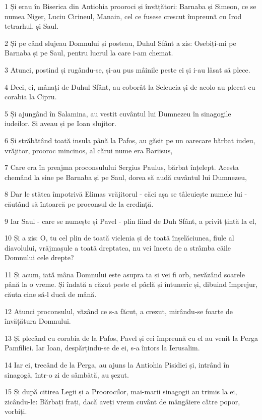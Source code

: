 \par 1 Și erau în Biserica din Antiohia prooroci și învățători: Barnaba și Simeon, ce se numea Niger, Luciu Cirineul, Manain, cel ce fusese crescut împreună cu Irod tetrarhul, și Saul.
\par 2 Și pe când slujeau Domnului și posteau, Duhul Sfânt a zis: Osebiți-mi pe Barnaba și pe Saul, pentru lucrul la care i-am chemat.
\par 3 Atunci, postind și rugându-se, și-au pus mâinile peste ei și i-au lăsat să plece.
\par 4 Deci, ei, mânați de Duhul Sfânt, au coborât la Seleucia și de acolo au plecat cu corabia la Cipru.
\par 5 Și ajungând în Salamina, au vestit cuvântul lui Dumnezeu în sinagogile iudeilor. Și aveau și pe Ioan slujitor.
\par 6 Și străbătând toată insula până la Pafos, au găsit pe un oarecare bărbat iudeu, vrăjitor, prooroc mincinos, al cărui nume era Bariisus,
\par 7 Care era în preajma proconsulului Sergius Paulus, bărbat înțelept. Acesta chemând la sine pe Barnaba și pe Saul, dorea să audă cuvântul lui Dumnezeu,
\par 8 Dar le stătea împotrivă Elimas vrăjitorul - căci așa se tâlcuiește numele lui - căutând să întoarcă pe proconsul de la credință.
\par 9 Iar Saul - care se numește și Pavel - plin fiind de Duh Sfânt, a privit țintă la el,
\par 10 Și a zis: O, tu cel plin de toată viclenia și de toată înșelăciunea, fiule al diavolului, vrăjmașule a toată dreptatea, nu vei înceta de a strâmba căile Domnului cele drepte?
\par 11 Și acum, iată mâna Domnului este asupra ta și vei fi orb, nevăzând soarele până la o vreme. Și îndată a căzut peste el pâclă și întuneric și, dibuind împrejur, căuta cine să-l ducă de mână.
\par 12 Atunci proconsulul, văzând ce s-a făcut, a crezut, mirându-se foarte de învățătura Domnului.
\par 13 Și plecând cu corabia de la Pafos, Pavel și cei împreună cu el au venit la Perga Pamfiliei. Iar Ioan, despărțindu-se de ei, s-a întors la Ierusalim.
\par 14 Iar ei, trecând de la Perga, au ajuns la Antiohia Pisidiei și, intrând în sinagogă, într-o zi de sâmbătă, au șezut.
\par 15 Și după citirea Legii și a Proorocilor, mai-marii sinagogii au trimis la ei, zicându-le: Bărbați frați, dacă aveți vreun cuvânt de mângâiere către popor, vorbiți.
